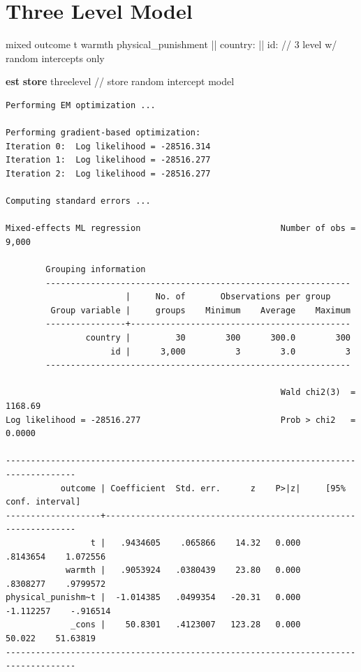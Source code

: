 \documentclass[
  letterpaper,
  DIV=11,
  numbers=noendperiod]{scrreprt}
\newenvironment{Shaded}{\begin{snugshade}}{\end{snugshade}}
\newcommand{\CommentTok}[1]{\textcolor[rgb]{0.37,0.37,0.37}{#1}}
\newcommand{\KeywordTok}[1]{\textcolor[rgb]{0.00,0.23,0.31}{\textbf{#1}}}
\newcommand{\NormalTok}[1]{\textcolor[rgb]{0.00,0.23,0.31}{#1}}
\begin{document}
\section{Three Level Model}\label{three-level-model}

\begin{Shaded}
\begin{Highlighting}[]

\NormalTok{mixed outcome t warmth physical\_punishment || country: || id:  }\CommentTok{// 3 level w/ random intercepts only}
    
\KeywordTok{est} \KeywordTok{store}\NormalTok{ threelevel }\CommentTok{// store random intercept model}
\end{Highlighting}
\end{Shaded}

\begin{verbatim}
Performing EM optimization ...

Performing gradient-based optimization: 
Iteration 0:  Log likelihood = -28516.314  
Iteration 1:  Log likelihood = -28516.277  
Iteration 2:  Log likelihood = -28516.277  

Computing standard errors ...

Mixed-effects ML regression                            Number of obs =   9,000

        Grouping information
        -------------------------------------------------------------
                        |     No. of       Observations per group
         Group variable |     groups    Minimum    Average    Maximum
        ----------------+--------------------------------------------
                country |         30        300      300.0        300
                     id |      3,000          3        3.0          3
        -------------------------------------------------------------

                                                       Wald chi2(3)  = 1168.69
Log likelihood = -28516.277                            Prob > chi2   =  0.0000

------------------------------------------------------------------------------------
           outcome | Coefficient  Std. err.      z    P>|z|     [95% conf. interval]
-------------------+----------------------------------------------------------------
                 t |   .9434605    .065866    14.32   0.000     .8143654    1.072556
            warmth |   .9053924   .0380439    23.80   0.000     .8308277    .9799572
physical_punishm~t |  -1.014385   .0499354   -20.31   0.000    -1.112257    -.916514
             _cons |    50.8301   .4123007   123.28   0.000       50.022    51.63819
------------------------------------------------------------------------------------


\end{verbatim}
\end{document}
